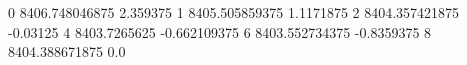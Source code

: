 0 8406.748046875 2.359375
1 8405.505859375 1.1171875
2 8404.357421875 -0.03125
4 8403.7265625 -0.662109375
6 8403.552734375 -0.8359375
8 8404.388671875 0.0
